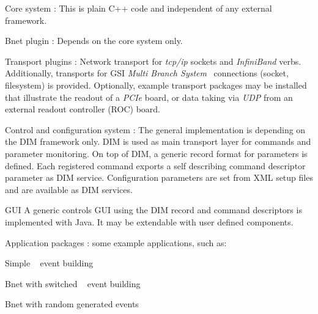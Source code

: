 \begin{compactdesc}
\item [Core system] : This is plain C++ code and independent of any external framework.
\item [Bnet plugin] : Depends on the core system only.
\item [Transport plugins] :  Network transport for  \textit{tcp/ip} sockets and \textit{InfiniBand} verbs. Additionally, 
transports for GSI \textit{Multi Branch System} \mbs\ connections (socket, filesystem) is provided. Optionally, example transport packages may be installed that
illustrate the readout of a \textit{PCIe} board, or data taking via \textit{UDP} from
an external readout controller (ROC) board.
\item [Control and configuration system]: The general implementation is depending on the DIM framework only.
DIM is used as main transport layer for commands and parameter monitoring.  On top of DIM, a generic record format for parameters is defined. Each registered command exports a self describing command descriptor  parameter as DIM service. Configuration parameters are set from XML setup files and are 
available as DIM services.      
\item  [GUI] A generic controls GUI using the DIM record and command descriptors is 
      implemented with Java. It may be extendable with user defined components.
\item[Application packages] : some example applications, such as: 
\begin{compactitem}[$\circ$]
\item  Simple \mbs~ event building
\item  Bnet with switched \mbs~ event building
\item  Bnet with random generated events
\end{compactitem}

      
\end{compactdesc}   



